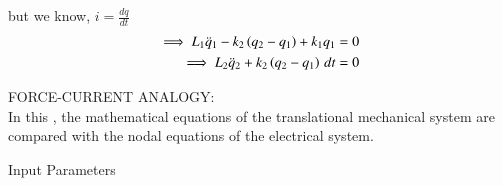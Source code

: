 \documentclass[journal,12pt,onecolumn]{IEEEtran}
\theoremstyle{remark}
\begin{document}
but we know, $i=\frac{dq}{dt}$ 
 \begin{align}
 \implies L_1\ddot q_1 -k_2\left(q_2-q_1\right) + k_1q_1  &=0 \\
 \implies L_2\ddot q_2+k_2\left(q_2-q_1\right) \, dt &=0
\end{align}  

FORCE-CURRENT ANALOGY:\\
In this , the mathematical equations of the translational mechanical system are compared with the nodal equations of the electrical system.


\begin{table}[!ht]    
    \centering
      
      \caption{Input Parameters}
    \label{table:ishitha.g22.nm.54.at1}
\end{table}
\end{document}
